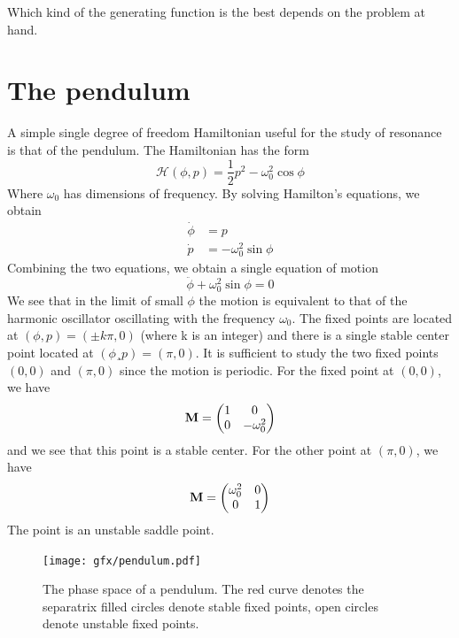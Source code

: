 \documentclass[twoside,openright,titlepage,numbers=noenddot,headinclude,%
                footinclude=true,cleardoublepage=empty,abstractoff, 
                BCOR=5mm,paper=a4,fontsize=11pt,%
                american,%
                ]{scrreprt}%
\begin{document}
Which kind of the generating function is the best depends on the
problem at hand.

\section{The pendulum}
\label{sec:pendulum}
A simple single degree of freedom Hamiltonian useful for the study
of resonance is that of the pendulum. The Hamiltonian has the form
\begin{equation}
    \mathcal{H}(\phi,p)= \frac{1}{2} p^2 -\omega_0^2\cos\phi
\end{equation}
Where $\omega_0$ has dimensions of frequency. By solving 
Hamilton's equations, we obtain
\begin{align}
    \dot{\phi} &= p\\
    \dot{p} &= - \omega_0^2\sin\phi
\end{align}
Combining the two equations, we obtain a single equation of motion
\begin{equation}
    \ddot{\phi}+\omega_0^2\sin\phi =0
\end{equation}
We see that in the limit of small $\phi$ the motion is equivalent to
that of the harmonic oscillator oscillating with the frequency
$\omega_0$. The fixed points are located at
$(\phi, p)=(\pm k\pi,0)$ (where k is an integer) and there is 
a single 
stable center point located at $(\phi¸ p)=(\pi, 0)$. It is 
sufficient to study the two fixed points $(0,0)$ and $(\pi,0)$
since the motion is periodic. For the fixed point at $(0,0)$, we have
\begin{equation}
    \boldsymbol{\mathbf{M}}=
    \begin{pmatrix}
        1 & 0\\
        0 & -\omega_0^2 
    \end{pmatrix}
\end{equation}
and we see that this point is a stable center. For the other point 
at $(\pi,0)$, we have
\begin{equation}
    \boldsymbol{\mathbf{M}}=
    \begin{pmatrix}
        \omega_0^2 & 0\\
        0 & 1
    \end{pmatrix}
\end{equation}
The point is an unstable saddle point.
\begin{figure}[htb]
\centering
\texttt{[image: gfx/pendulum.pdf]}
    \caption[Pendulum phase space portrait.]{The phase space of a pendulum. 
    The red curve denotes the 
    separatrix filled circles denote stable fixed points, open circles denote
    unstable fixed points.}
\label{fig:pendulum}
\end{figure}
\end{document}
